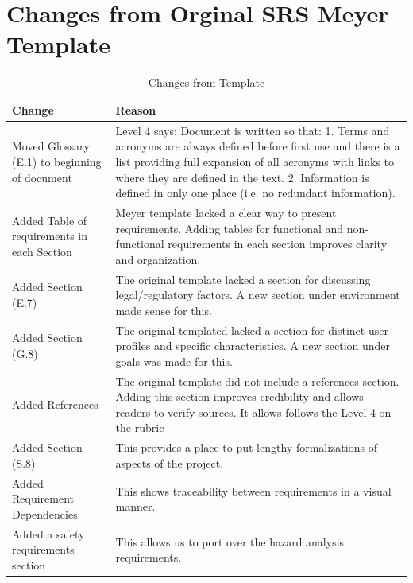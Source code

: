 \documentclass{article}
\begin{document}
\section*{Changes from Orginal SRS Meyer Template}
\begin{table}[H]
\caption{Changes from Template} \label{ChangesFromTemplate}
\begin{tabularx}{\textwidth}{|p{4cm}|>{\raggedright\arraybackslash}X|}
\hline
\textbf{Change} & \textbf{Reason} \\
\hline
Moved Glossary (E.1) to beginning of document & Level 4 says: Document is written so that: 1. Terms and acronyms are always defined before first use and there is a list providing full expansion of all acronyms with links to where they are defined in the text. 2. Information is defined in only one place (i.e. no redundant information). \\
\hline
Added Table of requirements in each Section & Meyer template lacked a clear way to present requirements. Adding tables for functional and non-functional requirements in each section improves clarity and organization. \\
\hline
Added Section (E.7) & The original template lacked a section for discussing legal/regulatory factors. A new section under environment made sense for this. \\
\hline
Added Section (G.8) & The original templated lacked a section for distinct user profiles and specific characteristics. A new section under goals was made for this.\\
\hline
Added References & The original template did not include a references section. Adding this section improves credibility and allows readers to verify sources. It allows follows the Level 4 on the rubric \\
\hline
Added Section (S.8) & This provides a place to put lengthy formalizations of aspects of the project. \\
\hline
Added Requirement Dependencies & This shows traceability between requirements in a visual manner. \\
\hline
Added a safety requirements section & This allows us to port over the hazard analysis requirements. \\
\hline
\end{tabularx}
\end{table}

\newpage

\medskip
\end{document}
